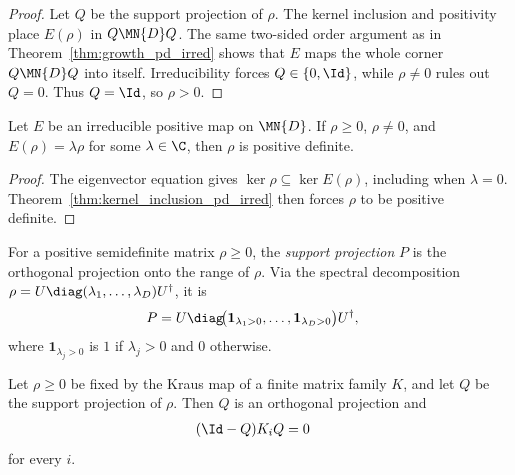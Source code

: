 \begin{proof}
    \leanok
    Let $Q$ be the support projection of $\rho$. The kernel inclusion and
    positivity place $E(\rho)$ in $Q\MN{D}Q$. The same two-sided order
    argument as in Theorem~\ref{thm:growth_pd_irred} shows that $E$ maps the
    whole corner $Q\MN{D}Q$ into itself. Irreducibility forces
    $Q\in\{0,\Id\}$, while $\rho\neq0$ rules out $Q=0$. Thus $Q=\Id$, so
    $\rho>0$.
\end{proof}

\begin{theorem}
    \label{thm:psd_eigenvector_pd_irred}
    \leanok
    Let $E$ be an irreducible positive map on $\MN{D}$.
    If $\rho\geq0$, $\rho\neq0$, and
    $E(\rho)=\lambda\rho$ for some $\lambda\in\C$, then $\rho$ is positive
    definite.
\end{theorem}

\begin{proof}
    \leanok
    The eigenvector equation gives
    $\ker\rho\subseteq\ker E(\rho)$, including when $\lambda=0$.
    Theorem~\ref{thm:kernel_inclusion_pd_irred} then forces $\rho$ to be
    positive definite.
\end{proof}

\begin{definition}\label{def:support_proj}
    \leanok
    For a positive semidefinite matrix $\rho\ge0$, the \emph{support
        projection} $P$ is the orthogonal projection onto the range of $\rho$.
    Via the spectral decomposition
    $\rho=U\diag(\lambda_1,\ldots,\lambda_D)U^\dagger$, it is
    \begin{align}
        P
         & =
        U\diag\!\bigl(        \mathbf{1}_{\lambda_1>0},\ldots,
        \mathbf{1}_{\lambda_D>0}
        \bigr)U^\dagger,
        \label{eq:qpf_support_projection}
    \end{align}
    where $\mathbf{1}_{\lambda_j>0}$ is $1$ if $\lambda_j>0$ and $0$ otherwise.
\end{definition}

\begin{theorem}
    \label{thm:kraus_fixed_support_lower_zero}
    \leanok
    Let $\rho\geq0$ be fixed by the Kraus map of a finite matrix family $K$, and
    let $Q$ be the support projection of $\rho$. Then $Q$ is an orthogonal
    projection and
    \begin{align}
        (\Id-Q)K_iQ
         & =0
        \notag
    \end{align}
    for every $i$.
\end{theorem}

